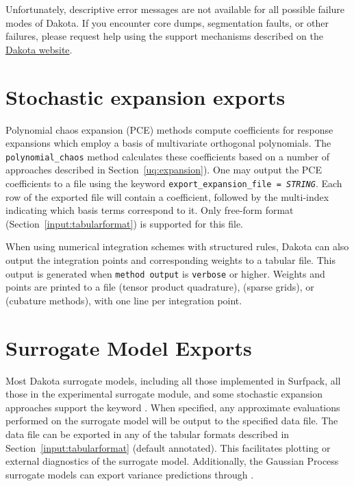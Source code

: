 Unfortunately, descriptive error messages are not available for all
possible failure modes of Dakota. If you encounter core dumps,
segmentation faults, or other failures, please request help using the
support mechanisms described on the
\href{http://dakota.sandia.gov/}{Dakota website}.


\section{Stochastic expansion exports}\label{sec:output:pce}

Polynomial chaos expansion (PCE) methods compute coefficients for
response expansions which employ a basis of multivariate orthogonal
polynomials.  The \texttt{polynomial\_chaos} method calculates these
coefficients based on a number of approaches described in
Section~\ref{uq:expansion}).  One may output the PCE coefficients to a
file using the keyword \texttt{export\_expansion\_file =
  \emph{STRING}}.  Each row of the exported file will contain a
coefficient, followed by the multi-index indicating which basis terms
correspond to it.  Only free-form format
(Section~\ref{input:tabularformat}) is supported for this file.

When using numerical integration schemes with structured rules, Dakota
can also output the integration points and corresponding weights to a
tabular file.  This output is generated when \texttt{method output} is
\texttt{verbose} or higher.  Weights and points are printed to a file
 (tensor product quadrature),
 (sparse grids), or
 (cubature methods), with one
line per integration point.

\section{Surrogate Model Exports}

Most Dakota surrogate models, including all those implemented in
Surfpack, all those in the experimental surrogate module, and some
stochastic expansion approaches support the keyword
.  When specified, any approximate
evaluations performed on the surrogate model will be output to the
specified data file.  The data file can be exported in any of the
tabular formats described in Section~\ref{input:tabularformat}
(default annotated).  This facilitates plotting or external
diagnostics of the surrogate model. Additionally, the Gaussian Process
surrogate models can export variance predictions through
.

